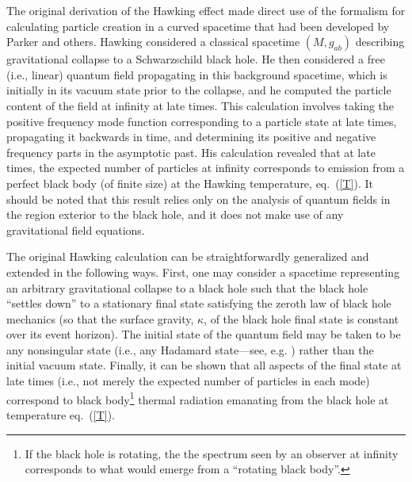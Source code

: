 The original derivation of the Hawking effect \cite{h2} made direct
use of the formalism for calculating particle creation in a curved
spacetime that had been developed by Parker \cite{par} and
others. Hawking considered a classical spacetime $(M, g_{ab})$
describing gravitational collapse to a Schwarzschild black hole. He
then considered a free (i.e., linear) quantum field propagating in
this background spacetime, which is initially in its vacuum state
prior to the collapse, and he computed the particle content of the
field at infinity at late times. This calculation involves taking the
positive frequency mode function corresponding to a particle state at
late times, propagating it backwards in time, and determining its
positive and negative frequency parts in the asymptotic past. His
calculation revealed that at late times, the expected number of
particles at infinity corresponds to emission from a perfect black
body (of finite size) at the Hawking temperature, eq.~(\ref{T}). It
should be noted that this result relies only on the analysis of
quantum fields in the region exterior to the black hole, and it does
not make use of any gravitational field equations.

The original Hawking calculation can be straightforwardly generalized
and extended in the following ways. First, one may consider a
spacetime representing an arbitrary gravitational collapse to a black
hole such that the black hole ``settles down'' to a stationary final
state satisfying the zeroth law of black hole mechanics (so that the
surface gravity, $\kappa$, of the black hole final state is constant
over its event horizon). The initial state of the quantum field may be
taken to be any nonsingular state (i.e., any Hadamard state---see,
e.g. \cite{w4}) rather than the initial vacuum state. Finally, it can
be shown \cite{w7} that all aspects of the final state at late times
(i.e., not merely the expected number of particles in each mode)
correspond to black body\footnote{If the black hole is rotating, the
the spectrum seen by an observer at infinity corresponds to what would
emerge from a ``rotating black body''.} thermal radiation emanating
from the black hole at temperature eq.~(\ref{T}).

